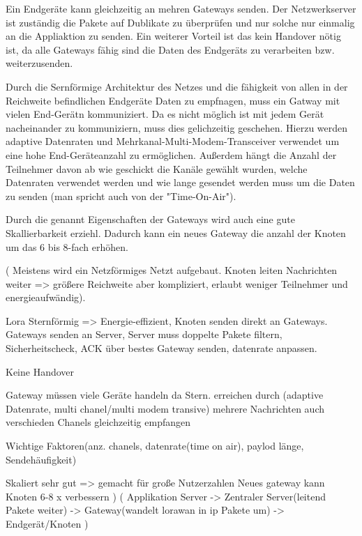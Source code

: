 \documentclass[a4paper,12pt]{article}
\begin{document}
            Ein Endgeräte kann gleichzeitig an mehren Gateways senden. Der Netzwerkserver ist zuständig die Pakete auf Dublikate zu überprüfen und nur solche nur einmalig an die Appliaktion zu senden.
            Ein weiterer Vorteil ist das kein Handover nötig ist, da alle Gateways fähig sind die Daten des Endgeräts zu verarbeiten bzw. weiterzusenden.
            
            Durch die Sernförmige Architektur des Netzes und die fähigkeit von allen in der Reichweite befindlichen Endgeräte Daten zu empfnagen, muss ein Gatway mit vielen End-Gerätn kommuniziert. 
            Da es nicht möglich ist mit jedem Gerät nacheinander zu kommuniziern, muss dies gelichzeitig geschehen. Hierzu werden adaptive Datenraten und Mehrkanal-Multi-Modem-Transceiver verwendet um eine hohe End-Geräteanzahl zu ermöglichen.
            Außerdem hängt die Anzahl der Teilnehmer davon ab wie geschickt die Kanäle gewählt wurden, welche Datenraten verwendet werden und wie lange gesendet werden muss um die Daten zu senden (man spricht auch von der "Time-On-Air").

            Durch die genannt Eigenschaften der Gateways wird auch eine gute Skallierbarkeit erziehl. Dadurch kann ein neues Gateway die anzahl der Knoten um das 6 bis 8-fach erhöhen. 
            
            \cite{WhatIsLoRa}(
                Meistens wird ein Netzförmiges Netzt aufgebaut. Knoten leiten Nachrichten weiter => größere Reichweite aber kompliziert, erlaubt weniger Teilnehmer und energieaufwändig). 

                Lora Sternförmig => Energie-effizient, Knoten senden direkt an Gateways. Gateways senden an Server, Server muss doppelte Pakete filtern, Sicherheitscheck, ACK über bestes Gateway senden, datenrate anpassen.

                Keine Handover

                Gateway müssen viele Geräte handeln da Stern. erreichen durch (adaptive Datenrate, multi chanel/multi modem transive) mehrere Nachrichten auch verschieden Chanels gleichzeitig empfangen

                Wichtige Faktoren(anz. chanels, datenrate(time on air), paylod länge, Sendehäufigkeit)
            
                Skaliert sehr gut => gemacht für große Nutzerzahlen
                Neues gateway kann Knoten 6-8 x verbessern
                )
            \cite{LoRaSpec}(
                Applikation Server -> Zentraler Server(leitend Pakete weiter) -> Gateway(wandelt lorawan in ip Pakete um) -> Endgerät/Knoten       )
\end{document}
